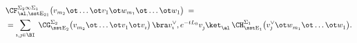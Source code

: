 \begin{equation}\begin{aligned}
{}& \CF_{\al,{\rm \sst E_{21}}}^{\Sigma_2\infty\Sigma_1} 
\big(v_{m_2}\ot\dots\ot v_{1}\ot w_{m_1}\ot\dots \ot w_{1}\big)
\;=\;\\
 &=\sum_{\imath,\jmath\in\BI}\;
\CG_{\rm \sst E_2}^{\Sigma_2} 
\big( v_{m_2}^{}\ot\dots\ot v_{1}^{}\ot v_{\imath}^{}\big)
\,\bra  v^{\vee}_{\imath},e^{-tL_0} v_{\jmath}^{}
\ket_{\al}^{\phantom{\dagger}}\,
\CH_{\rm \sst E_1}^{\Sigma_1} 
\big( v^{\vee}_{\jmath}\ot w_{m_1}^{}\ot\dots\ot w_{1}^{}\big).
\end{aligned}
\end{equation}

